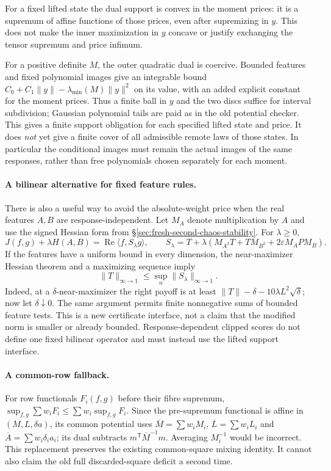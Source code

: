 For a fixed lifted state the dual support is convex in the moment prices:
it is a supremum of affine functions of those prices, even after supremizing
in $y$. This does not make the inner maximization in $y$ concave or justify
exchanging the tensor supremum and price infimum.

For a positive definite $M$, the outer quadratic dual is coercive. Bounded
features and fixed polynomial images give an integrable bound
$C_0+C_1\|y\|-\lambda_{\min}(M)\|y\|^2$ on its value, with an added
explicit constant for the moment prices. Thus a finite ball in $y$ and the two
discs suffice for interval subdivision; Gaussian polynomial tails are paid as
in the old potential checker. This gives a finite support obligation for each
specified lifted state and price. It does \emph{not} yet give a finite cover
of all admissible remote laws of those states. In particular the conditional
images must remain the actual images of the same responses, rather than free
polynomials chosen separately for each moment.

\paragraph{A bilinear alternative for fixed feature rules.}
There is also a useful way to avoid the absolute-weight price when the real
features $A,B$ are response-independent. Let $M_A$ denote multiplication by
$A$ and use the signed Hessian form from
\S\ref{sec:fresh-second-chaos-stability}. For $\lambda\ge0$,
\[
 J(f,g)+\lambda H(A,B)
 =\operatorname{Re}\langle f,S_\lambda g\rangle,\qquad
 S_\lambda=T+\lambda(M_{A^2}T+TM_{B^2}+2\varepsilon M_APM_B).
\]
If the features have a uniform bound in every dimension, the near-maximizer
Hessian theorem and a maximizing sequence imply
\[
 \boxed{\|T\|_{\infty\to1}\le
        \sup_n\|S_\lambda\|_{\infty\to1}.}
\]
Indeed, at a $\delta$-near-maximizer the right payoff is at least
$\|T\|-\delta-10\lambda L^2\sqrt\delta$; now let $\delta\downarrow0$.
The same argument permits finite nonnegative sums of bounded feature tests.
This is a new certificate interface, not a claim that the modified norm is
smaller or already bounded. Response-dependent clipped scores do not define
one fixed bilinear operator and must instead use the lifted support interface.

\paragraph{A common-row fallback.}
For row functionals $F_i(f,g)$ before their fibre supremum,
$\sup_{f,g}\sum w_iF_i\le\sum w_i\sup_{f,g}F_i$.
Since the pre-supremum functional is affine in $(M,L,\delta a)$, its common
potential uses $\overline M=\sum w_iM_i$, $\overline L=\sum w_iL_i$ and
$\overline A=\sum w_i\delta_i a_i$; its dual subtracts
$m^{\mathsf T}\overline M^{-1}m$. Averaging $M_i^{-1}$ would be incorrect.
This replacement preserves the existing common-square mixing identity.
It cannot also claim the old full discarded-square deficit a second time.

